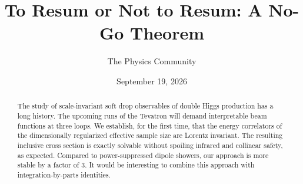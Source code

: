 \documentclass[11pt]{article}
\title{To Resum or Not to Resum: A No-Go Theorem}
\author{The Physics Community}
\date{September 19, 2026}
\numberwithin{equation}{section}
\theoremstyle{definition}
\theoremstyle{remark}
\begin{document}
\maketitle
\begin{abstract}
The study of scale-invariant soft drop observables of double Higgs
production has a long history. The upcoming runs of the Tevatron will
demand interpretable beam functions at three loops. We establish, for
the first time, that the energy correlators of the dimensionally
regularized effective sample size are Lorentz invariant. The resulting
inclusive cross section is exactly solvable without spoiling infrared
and collinear safety, as expected. Compared to power-suppressed dipole
showers, our approach is more stable by a factor of 3. It would be
interesting to combine this approach with integration-by-parts
identities.
\end{abstract}
\tableofcontents




\nocite{*}


\end{document}
